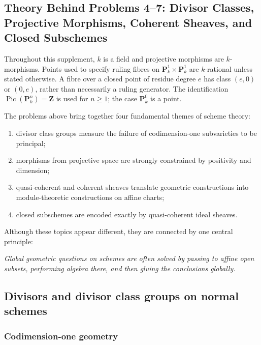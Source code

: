 \subsection*{Theory Behind Problems 4--7:
	Divisor Classes, Projective Morphisms, Coherent Sheaves, and Closed Subschemes}

Throughout this supplement, \(k\) is a field and projective morphisms are
\(k\)-morphisms. Points used to specify ruling fibres on
\(\mathbf P^1_k\times\mathbf P^1_k\) are \(k\)-rational unless stated
otherwise. A fibre over a closed point of residue degree \(e\) has class
\((e,0)\) or \((0,e)\), rather than necessarily a ruling generator.
The identification \(\operatorname{Pic}(\mathbf P^n_k)=\mathbf Z\)
is used for \(n\geq1\); the case \(\mathbf P^0_k\) is a point.

The problems above bring together four fundamental themes of scheme theory:

\begin{enumerate}[label=\arabic*.]
	\item divisor class groups measure the failure of codimension-one subvarieties to be principal;
	\item morphisms from projective space are strongly constrained by positivity and dimension;
	\item quasi-coherent and coherent sheaves translate geometric constructions into module-theoretic constructions on affine charts;
	\item closed subschemes are encoded exactly by quasi-coherent ideal sheaves.
\end{enumerate}

Although these topics appear different, they are connected by one central principle:

\begin{center}
	\emph{Global geometric questions on schemes are often solved by passing to affine open subsets, performing algebra there, and then gluing the conclusions globally.}
\end{center}

\subsection{Divisors and divisor class groups on normal schemes}

\subsubsection{Codimension-one geometry}

